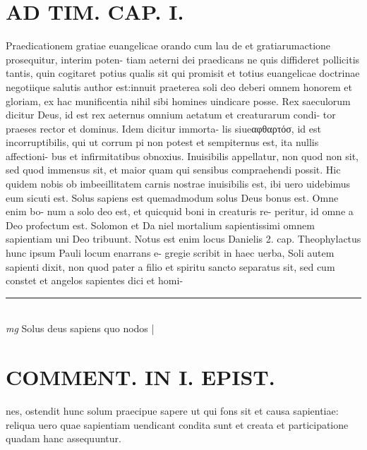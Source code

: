 \documentclass{article}
\begin{document}
\begin{pages}
\section*{AD TIM. CAP. I. }
\marginpar{[ p.106 ]}\pstart Praedicationem gratiae euangelicae orando cum lau de et gratiarumactione prosequitur, interim poten- tiam aeterni dei praedicans ne quis diffideret pollicitis tantis, quin cogitaret potius qualis sit qui promisit et totius euangelicae doctrinae negotiique salutis author est:innuit praeterea soli deo deberi omnem honorem et gloriam, ex hac munificentia nihil sibi homines uindicare posse. Rex saeculorum dicitur Deus, id est rex aeternus omnium aetatum et creaturarum condi- tor praeses rector et dominus. Idem dicitur immorta- lis siueαφθαρτόσ, id est incorruptibilis, qui ut corrum pi non potest et sempiternus est, ita nullis affectioni- bus et infirmitatibus obnoxius. Inuisibilis appellatur, non quod non sit, sed quod immensus sit, et maior quam qui sensibus compraehendi possit. Hic quidem nobis ob imbeeillitatem carnis nostrae inuisibilis est, ibi uero uidebimus eum sicuti est. Solus sapiens est quemadmodum solus Deus bonus est. Omne enim bo- num a solo deo est, et quicquid boni in creaturis re- peritur, id omne a Deo profectum est. Solomon et Da niel mortalium sapientissimi omnem sapientiam uni Deo tribuunt. Notus est enim locus Danielis 2. cap. Theophylactus hunc ipsum Pauli locum enarrans e- gregie scribit in haec uerba, Soli autem sapienti dixit, non quod pater a filio et spiritu sancto separatus sit, sed cum constet et angelos sapientes dici et homi-  \pend
\vspace{0.5cm}\noindent
\vspace{0.2cm}\rule{1cm}{0.2pt}\\ 
\hspace{0.2cm}\textit{mg}
\footnotesize Solus deus sapiens quo nodos 
\normalsize| 
\section*{COMMENT. IN I. EPIST. }\pstart nes, ostendit hunc solum praecipue sapere ut qui fons sit et causa sapientiae: reliqua uero quae sapientiam uendicant condita sunt et creata et participatione quadam hanc assequuntur.  \pend
{}
{}

\end{pages}
\end{document}
